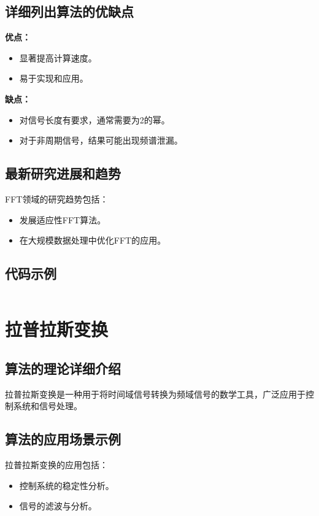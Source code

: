 \subsection*{详细列出算法的优缺点}
\textbf{优点：}
\begin{itemize}
    \item 显著提高计算速度。
    \item 易于实现和应用。
\end{itemize}

\textbf{缺点：}
\begin{itemize}
    \item 对信号长度有要求，通常需要为2的幂。
    \item 对于非周期信号，结果可能出现频谱泄漏。
\end{itemize}

\subsection*{最新研究进展和趋势}
FFT领域的研究趋势包括：
\begin{itemize}
    \item 发展适应性FFT算法。
    \item 在大规模数据处理中优化FFT的应用。
\end{itemize}
\subsection*{代码示例}
\begin{lstlisting}

\end{lstlisting}


\section{拉普拉斯变换}
\subsection*{算法的理论详细介绍}
拉普拉斯变换是一种用于将时间域信号转换为频域信号的数学工具，广泛应用于控制系统和信号处理。

\subsection*{算法的应用场景示例}
拉普拉斯变换的应用包括：
\begin{itemize}
    \item 控制系统的稳定性分析。
    \item 信号的滤波与分析。
\end{itemize}

